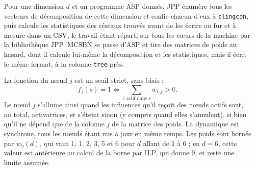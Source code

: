 

Pour une dimension $d$ et un programme ASP donnés, JPP énumère tous les vecteurs de décomposition de cette dimension et confie chacun d'eux à \texttt{clingcon}, puis calcule les statistiques des réseaux trouvés avant de les écrire au fur et à mesure dans un CSV, le travail étant réparti sur tous les cœurs de la machine par la bibliothèque JPP.
MCSBN se passe d'ASP et tire des matrices de poids au hasard, dont il calcule lui-même la décomposition et les statistiques, mais il écrit le même format, à la colonne \texttt{tree} près.


La fonction du nœud $j$ est un seuil strict, sans biais :
\begin{equation}
  f_j(s) = 1 \iff \sum_{i \text{ actif dans } s} w_{i,j} > 0 .
\end{equation}
Le nœud $j$ s'allume ainsi quand les influences qu'il reçoit des nœuds actifs sont, au total, activatrices, et s'éteint sinon (y compris quand elles s'annulent), si bien qu'il ne dépend que de la colonne $j$ de la matrice des poids.
La dynamique est synchrone, tous les nœuds étant mis à jour en même temps.
Les poids sont bornés par $w_{\mathrm{b}}(d)$, qui vaut 1, 1, 2, 3, 5 et 6 pour $d$ allant de 1 à 6 ; en $d=6$, cette valeur est antérieure au calcul de la borne par ILP, qui donne 9, et reste une limite assumée.


